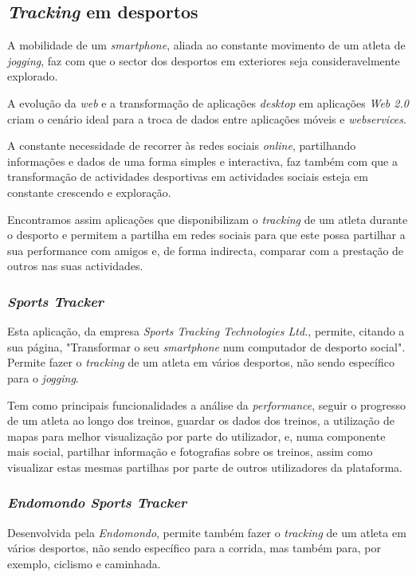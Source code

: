 \documentclass[twocolumn,twoside,10pt,a4paper]{article}
\begin{document}
\subsection{\emph{Tracking} em desportos}

A mobilidade de um \emph{smartphone}, aliada ao constante movimento de um atleta de \emph{jogging}, faz com que o sector dos desportos em exteriores seja consideravelmente explorado.

A evolução da \emph{web} e a transformação de aplicações \emph{desktop} em aplicações \emph{Web 2.0} criam o cenário ideal para a troca de dados entre aplicações móveis e \emph{webservices}.

A constante necessidade de recorrer às redes sociais \emph{online}, partilhando informações e dados de uma forma simples e interactiva, faz também com que a transformação de actividades desportivas em actividades sociais esteja em constante crescendo e exploração.
 
Encontramos assim aplicações que disponibilizam o \emph{tracking} de um atleta durante o desporto e permitem a partilha em redes sociais para que este possa partilhar a sua performance com amigos e, de forma indirecta, comparar com a prestação de outros nas suas actividades.

\subsubsection{\emph{Sports Tracker}}

Esta aplicação, da empresa \textit{Sports Tracking Technologies Ltd.}, permite, citando a sua página, "Transformar o seu \textit{smartphone} num computador de desporto social". Permite fazer o \textit{tracking} de um atleta em vários desportos, não sendo específico para o \textit{jogging}. 

Tem como principais funcionalidades a análise da \textit{performance}, seguir o progresso de um atleta ao longo dos treinos, guardar os dados dos treinos, a utilização de mapas para melhor visualização por parte do utilizador,  e, numa componente mais social, partilhar informação e fotografias sobre os treinos, assim como visualizar estas mesmas partilhas por parte de outros utilizadores da plataforma.

\subsubsection{\emph{Endomondo Sports Tracker}}

Desenvolvida pela \textit{Endomondo}, permite também fazer o \textit{tracking} de um atleta em vários desportos, não sendo específico para a corrida, mas também para, por exemplo, ciclismo e caminhada.
\end{document}
